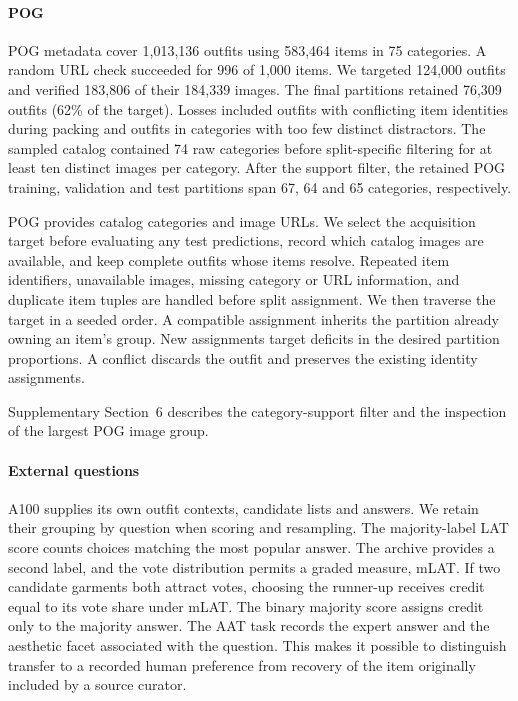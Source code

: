 \paragraph{POG}
POG metadata cover 1,013,136 outfits using 583,464 items in 75 categories. A random URL check succeeded for 996 of 1,000 items. We targeted 124,000 outfits and verified 183,806 of their 184,339 images. The final partitions retained 76,309 outfits (62\% of the target). Losses included outfits with conflicting item identities during packing and outfits in categories with too few distinct distractors. The sampled catalog contained 74 raw categories before split-specific filtering for at least ten distinct images per category. After the support filter, the retained POG training, validation and test partitions span 67, 64 and 65 categories, respectively.

POG provides catalog categories and image URLs. We select the acquisition target before evaluating any test predictions, record which catalog images are available, and keep complete outfits whose items resolve. Repeated item identifiers, unavailable images, missing category or URL information, and duplicate item tuples are handled before split assignment. We then traverse the target in a seeded order. A compatible assignment inherits the partition already owning an item's group. New assignments target deficits in the desired partition proportions. A conflict discards the outfit and preserves the existing identity assignments.

Supplementary Section~6 describes the category-support filter and the inspection of the largest POG image group.

\paragraph{External questions}
A100 supplies its own outfit contexts, candidate lists and answers. We retain their grouping by question when scoring and resampling. The majority-label LAT score counts choices matching the most popular answer. The archive provides a second label, and the vote distribution permits a graded measure, mLAT. If two candidate garments both attract votes, choosing the runner-up receives credit equal to its vote share under mLAT. The binary majority score assigns credit only to the majority answer. The AAT task records the expert answer and the aesthetic facet associated with the question. This makes it possible to distinguish transfer to a recorded human preference from recovery of the item originally included by a source curator.
